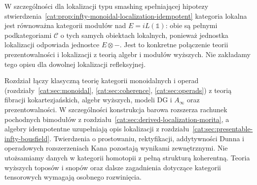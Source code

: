 W szczególności dla lokalizacji typu smashing spełniającej hipotezy stwierdzenia~\ref{cat:prop:infty-monoidal-localization-idempotent} kategoria lokalna jest równoważna kategorii modułów nad $E=iL(\mathbb 1)$: obie są pełnymi podkategoriami $\mathcal C$ o tych samych obiektach lokalnych, ponieważ jednostka lokalizacji odpowiada jednostce $E\otimes-$. Jest to konkretne połączenie teorii prezentowalności i lokalizacji z teorią algebr i modułów wyższych. Nie zakładamy tego opisu dla dowolnej lokalizacji refleksyjnej.

\begin{uwaga}\label{cat:rem:infty-monoidal-scope}
Rozdział łączy klasyczną teorię kategorii monoidalnych i operad (rozdziały~\ref{cat:sec:monoidal}, \ref{cat:sec:coherence}, \ref{cat:sec:operads}) z teorią fibracji kokartezjańskich, algebr wyższych, modeli DG i $A_\infty$ oraz prezentowalności. W szczególności konstrukcja barowa rozszerza rachunek pochodnych bimodułów z rozdziału~\ref{cat:sec:derived-localization-morita}, a algebry idempotentne uzupełniają opis lokalizacji z rozdziału~\ref{cat:sec:presentable-infty-bousfield}. Twierdzenia o prostowaniu, rektyfikacji, addytywności Dunna i operadowych rozszerzeniach Kana pozostają wynikami zewnętrznymi. Nie utożsamiamy danych w kategorii homotopii z pełną strukturą koherentną. Teoria wyższych toposów i snopów oraz dalsze zagadnienia dotyczące kategorii tensorowych wymagają osobnego rozwinięcia.
\end{uwaga}
